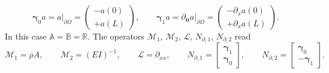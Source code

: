 \begin{equation}
	\bm\gamma_0 a = a\vert_{\partial\Omega} = \begin{pmatrix}
	-a(0) \\ +a(L)
	\end{pmatrix}, \qquad \bm\gamma_1 a = \partial_{\bm{n}} a\vert_{\partial\Omega} = \begin{pmatrix}
	-\partial_x a(0) \\ +\partial_x a(L)
	\end{pmatrix}.
\end{equation}
In this case $\mathbb{A} = \mathbb{B} = \mathbb{R}$. The operators $\mathcal{M}_1, \, \mathcal{M}_2, \, \mathcal{L}, \, N_{\partial, 1}, \, N_{\partial, 2}$ read
\begin{equation}
\mathcal{M}_1 = \rho A, \qquad 
\mathcal{M}_2 = (EI)^{-1}, \qquad 
\mathcal{L} = \partial_{xx}, \qquad 
N_{\partial, 1} = \begin{bmatrix}
\bm\gamma_1 \\ \bm\gamma_0
\end{bmatrix}, \qquad 
N_{\partial, 2} = \begin{bmatrix}
\bm\gamma_0 \\ -\bm\gamma_1
\end{bmatrix}.
\end{equation}

